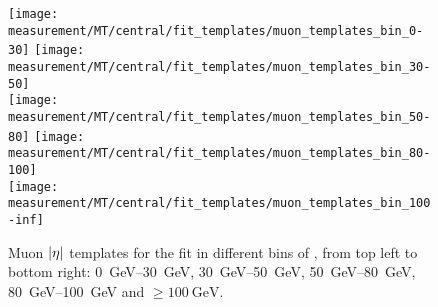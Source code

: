 \begin{figure}[!htbp]
  \centering
    \hspace*{\fill}
    {\texttt{[image: measurement/MT/central/fit\_templates/muon\_templates\_bin\_0-30]}}\hfill
    {\texttt{[image: measurement/MT/central/fit\_templates/muon\_templates\_bin\_30-50]}}
    \hspace*{\fill} \\
    \hspace*{\fill}
    {\texttt{[image: measurement/MT/central/fit\_templates/muon\_templates\_bin\_50-80]}}\hfill
    {\texttt{[image: measurement/MT/central/fit\_templates/muon\_templates\_bin\_80-100]}}
    \hspace*{\fill} \\
    \hspace*{\fill}
    {\texttt{[image: measurement/MT/central/fit\_templates/muon\_templates\_bin\_100-inf]}}
    \hspace*{\fill}
    \caption{Muon $\lvert \eta \rvert$ templates for the fit in different bins of \MT,
    from top left to bottom right: \SIrange{0}{30}{\GeV}, \SIrange{30}{50}{\GeV},
    \SIrange{50}{80}{\GeV}, \SIrange{80}{100}{\GeV} and $\geq \SI{100}{\GeV}$.}
    \label{fig:fit_templates_MT_muon}
\end{figure}



